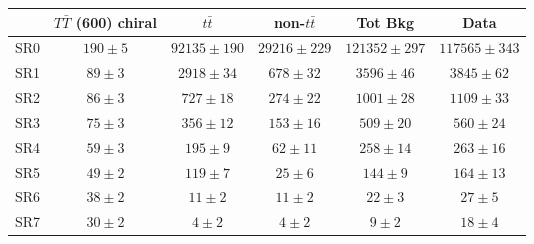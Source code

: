 \begin{tabular}{l c c c c c } \toprule\toprule
 & $T\bar{T}$ (600) chiral 		 & $t\bar{t}$ 		 & non-$t\bar{t}$ 		 & Tot Bkg 		 & Data 		 \\ \midrule 
  SR0  & $190 \pm 5$  & $92135 \pm 190$  & $29216 \pm 229$  & $121352 \pm 297$  & $117565 \pm 343$ \\ 
 SR1  & $89 \pm 3$  & $2918 \pm 34$  & $678 \pm 32$  & $3596 \pm 46$  & $3845 \pm 62$ \\ 
 SR2  & $86 \pm 3$  & $727 \pm 18$  & $274 \pm 22$  & $1001 \pm 28$  & $1109 \pm 33$ \\ 
 SR3  & $75 \pm 3$  & $356 \pm 12$  & $153 \pm 16$  & $509 \pm 20$  & $560 \pm 24$ \\ 
 SR4  & $59 \pm 3$  & $195 \pm 9$  & $62 \pm 11$  & $258 \pm 14$  & $263 \pm 16$ \\ 
 SR5  & $49 \pm 2$  & $119 \pm 7$  & $25 \pm 6$  & $144 \pm 9$  & $164 \pm 13$ \\ 
 SR6  & $38 \pm 2$  & $11 \pm 2$  & $11 \pm 2$  & $22 \pm 3$  & $27 \pm 5$ \\ 
 SR7  & $30 \pm 2$  & $4 \pm 2$  & $4 \pm 2$  & $9 \pm 2$  & $18 \pm 4$ \\ 
\bottomrule\end{tabular}